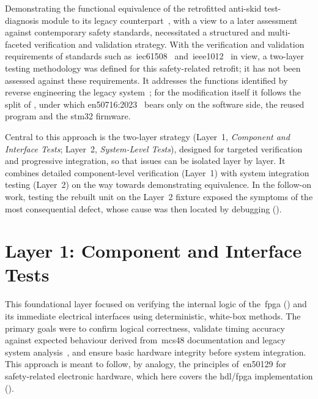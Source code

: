 Demonstrating the functional equivalence of the retrofitted anti-skid test-diagnosis module to its legacy counterpart~\cite{rexroth1992wsp}, with a view to a later assessment against contemporary safety standards, necessitated a structured and multi-faceted verification and validation strategy. With the verification and validation requirements of standards such as~\gls{iec61508}~\cite{iec61508_2010} and~\gls{ieee1012}~\cite{ieee1012_2024} in view, a two-layer testing methodology was defined for this safety-related retrofit; it has not been assessed against these requirements. It addresses the functions identified by reverse engineering the legacy system~\cite{rexroth1992wsp, ayoub2014, leyer2023}; for the modification itself it follows the split of , under which \gls{en50716}:2023~\cite{en50716_2023} bears only on the software side, the reused program and the \gls{stm32} firmware.

Central to this approach is the two-layer strategy (Layer~1, \textit{Component and Interface Tests}; Layer~2, \textit{System-Level Tests}), designed for targeted verification and progressive integration, so that issues can be isolated layer by layer. It combines detailed component-level verification (Layer~1) with system integration testing (Layer~2) on the way towards demonstrating equivalence. In the follow-on work, testing the rebuilt unit on the Layer~2 fixture exposed the symptoms of the most consequential defect, whose cause was then located by debugging ().

\section{Layer 1: Component and Interface Tests}
\label{sec:fpga_interface_testing}

This foundational layer focused on verifying the internal logic of the~\gls{fpga} () and its immediate electrical interfaces using deterministic, white-box methods. The primary goals were to confirm logical correctness, validate timing accuracy against expected behaviour derived from~\gls{mcs48} documentation and legacy system analysis~\cite{rexroth1992wsp}, and ensure basic hardware integrity before system integration. This approach is meant to follow, by analogy, the principles of~\gls{en50129} for safety-related electronic hardware, which here covers the \gls{hdl}/\gls{fpga} implementation ().

